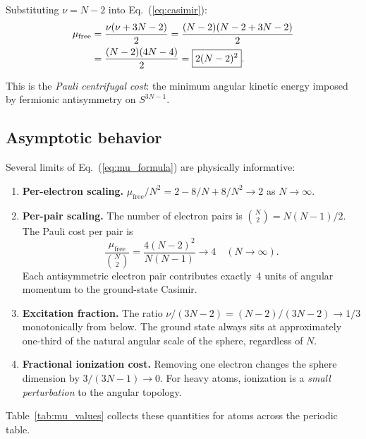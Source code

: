 \documentclass[aps,prl,twocolumn,superscriptaddress,longbibliography]{revtex4-2}
\newcommand{\mufree}{\mu_{\mathrm{free}}}
\begin{document}
Substituting $\nu = N - 2$ into Eq.~(\ref{eq:casimir}):
\begin{align}
  \mufree &= \frac{\nu(\nu + 3N - 2)}{2}
           = \frac{(N-2)(N - 2 + 3N - 2)}{2} \notag \\
          &= \frac{(N-2)(4N-4)}{2}
           = \boxed{2(N-2)^2}.
  \label{eq:mu_formula}
\end{align}

This is the \emph{Pauli centrifugal cost}: the minimum angular kinetic
energy imposed by fermionic antisymmetry on $S^{3N-1}$.

\subsection{Asymptotic behavior}
\label{sec:asymptotic}

Several limits of Eq.~(\ref{eq:mu_formula}) are physically
informative:

\begin{enumerate}
  \item \textbf{Per-electron scaling.}  $\mufree / N^2 = 2 - 8/N +
    8/N^2 \to 2$ as $N \to \infty$.

  \item \textbf{Per-pair scaling.}  The number of electron pairs is
    $\binom{N}{2} = N(N-1)/2$.  The Pauli cost per pair is
    \begin{equation}
      \frac{\mufree}{\binom{N}{2}}
        = \frac{4(N-2)^2}{N(N-1)} \longrightarrow 4
        \quad (N \to \infty).
      \label{eq:per_pair}
    \end{equation}
    Each antisymmetric electron pair contributes exactly~4 units
    of angular momentum to the ground-state Casimir.

  \item \textbf{Excitation fraction.}  The ratio $\nu/(3N-2) =
    (N-2)/(3N-2) \to 1/3$ monotonically from below.  The ground state
    always sits at approximately one-third of the natural angular
    scale of the sphere, regardless of $N$.

  \item \textbf{Fractional ionization cost.}  Removing one electron
    changes the sphere dimension by $3/(3N-1) \to 0$.  For heavy
    atoms, ionization is a \emph{small perturbation} to the angular
    topology.
\end{enumerate}

Table~\ref{tab:mu_values} collects these quantities for atoms across
the periodic table.
\end{document}
